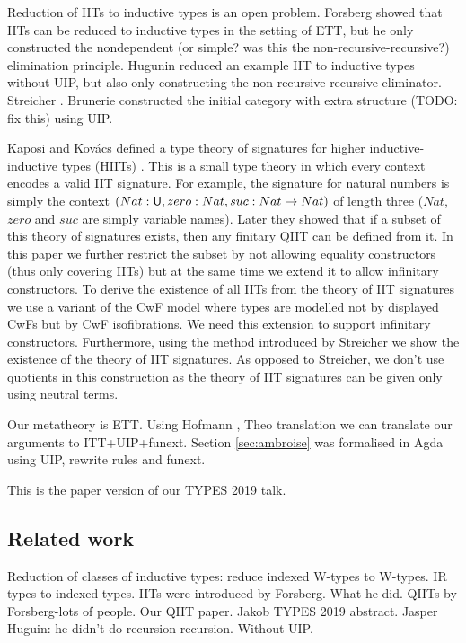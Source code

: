 \documentclass[a4paper,UKenglish,cleveref, autoref]{lipics-v2019}
\begin{document}
Reduction of IITs to inductive types is an open problem. Forsberg
showed that IITs can be reduced to inductive types in the setting of
ETT, but he only constructed the nondependent (or simple? was this the
non-recursive-recursive?) elimination principle. Hugunin \cite{jasper}
reduced an example IIT to inductive types without UIP, but also only
constructing the non-recursive-recursive eliminator. Streicher
\cite{streichersemantics}. Brunerie \cite{} constructed the initial
category with extra structure (TODO: fix this) using UIP.

Kaposi and Kov{\'a}cs defined a type theory of signatures for higher
inductive-inductive types (HIITs)
\cite{kaposi_et_al:LIPIcs:2018:9190}. This is a small type theory in
which every context encodes a valid IIT signature. For example, the
signature for natural numbers is simply the context
$(Nat:\mathsf{U},zero:Nat,suc:Nat\rightarrow Nat)$ of length three ($Nat$, $zero$ and
$suc$ are simply variable names). Later they showed
\cite{Kaposi:2019:CQI:3302515.3290315} that if a subset of this theory
of signatures exists, then any finitary QIIT can be defined from
it. In this paper we further restrict the subset by not allowing
equality constructors (thus only covering IITs) but at the same time
we extend it to allow infinitary constructors. To derive the existence
of all IITs from the theory of IIT signatures we use a variant of the
CwF model \cite{Kaposi:2019:CQI:3302515.3290315} where types are
modelled not by displayed CwFs but by CwF isofibrations. We need this
extension to support infinitary constructors. Furthermore, using the
method introduced by Streicher \cite{streichersemantics} we show the
existence of the theory of IIT signatures. As opposed to Streicher, we
don't use quotients in this construction as the theory of IIT
signatures can be given only using neutral terms.

Our metatheory is ETT. Using Hofmann \cite{}, Theo \cite{} translation
we can translate our arguments to ITT+UIP+funext. Section
\ref{sec:ambroise} was formalised in Agda using UIP, rewrite rules and
funext.

This is the paper version of our TYPES 2019 talk.

\subsection{Related work}

Reduction of classes of inductive types: reduce indexed W-types to
W-types. IR types to indexed types. IITs were introduced by
Forsberg. What he did.  QIITs by Forsberg-lots of people. Our QIIT
paper. Jakob TYPES 2019 abstract.  Jasper Huguin: he didn't do
recursion-recursion. Without UIP.
\end{document}
